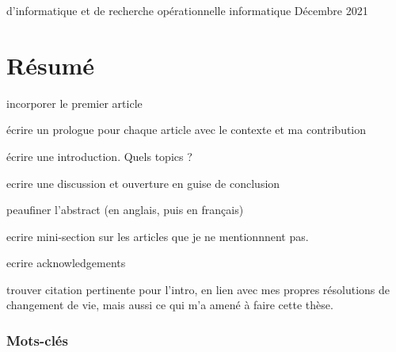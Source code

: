\documentclass[12pt]{report} %
\numberwithin{equation}{chapter}
\numberwithin{table}{chapter}
\numberwithin{figure}{chapter}
\begin{document}




    {}
    {d'informatique et de recherche op\'{e}rationnelle}
    {informatique}
    {Décembre}
    {2021}

\PagesCouverture
\newpage


\chapter*{Résumé}

incorporer le premier article

écrire un prologue pour chaque article avec le contexte et ma contribution

écrire une introduction. Quels topics ? 

ecrire une discussion et ouverture en guise de conclusion

peaufiner l’abstract (en anglais, puis en français)

ecrire mini-section sur les articles que je ne mentionnnent pas. 

ecrire acknowledgements

trouver citation pertinente pour l’intro, en lien avec mes propres résolutions de changement de vie, mais aussi ce qui m’a amené à faire cette thèse.


\subsection*{Mots-clés}
\end{document}
